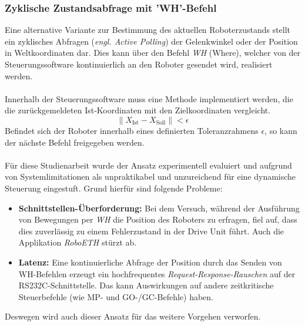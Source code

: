 \subsubsection*{Zyklische Zustandsabfrage mit 'WH'-Befehl}
Eine alternative Variante zur Bestimmung des aktuellen Roboterzustands stellt ein zyklisches Abfragen (\textit{engl. Active Polling}) der Gelenkwinkel oder der Position in Weltkoordinaten dar. Dies kann über den Befehl \textit{WH} (Where), welcher von der Steuerungssoftware kontinuierlich an den Roboter gesendet wird, realisiert werden.\\
\\Innerhalb der Steuerungssoftware muss eine Methode implementiert werden, die die zurückgemeldeten Ist-Koordinaten mit den Zielkoordinaten vergleicht. 
\begin{equation}
	\|X_{\text{Ist}} - X_{\text{Soll}}\| < \epsilon
\end{equation}
Befindet sich der Roboter innerhalb eines definierten Toleranzrahmens $\epsilon$, so kann der nächste Befehl freigegeben werden.\\
\\Für diese Studienarbeit wurde der Ansatz experimentell evaluiert und aufgrund von Systemlimitationen als unpraktikabel und unzureichend für eine dynamische Steuerung eingestuft. Grund hierfür sind folgende Probleme:
\begin{itemize}
	\item \textbf{Schnittstellen-Überforderung:} Bei dem Versuch, während der Ausführung von Bewegungen per \textit{WH} die Position des Roboters zu erfragen, fiel auf, dass dies zuverlässig zu einem Fehlerzustand in der Drive Unit führt. Auch die Applikation \textit{RoboETH} stürzt ab.
	\item \textbf{Latenz:} Eine kontinuierliche Abfrage der Position durch das Senden von WH-Befehlen erzeugt ein hochfrequentes \textit{Request-Response-Rauschen} auf der RS232C-Schnittstelle. Das kann Auswirkungen auf andere zeitkritische Steuerbefehle (wie MP- und GO-/GC-Befehle) haben.   
\end{itemize}
Deswegen wird auch dieser Ansatz für das weitere Vorgehen verworfen.
\newpage

